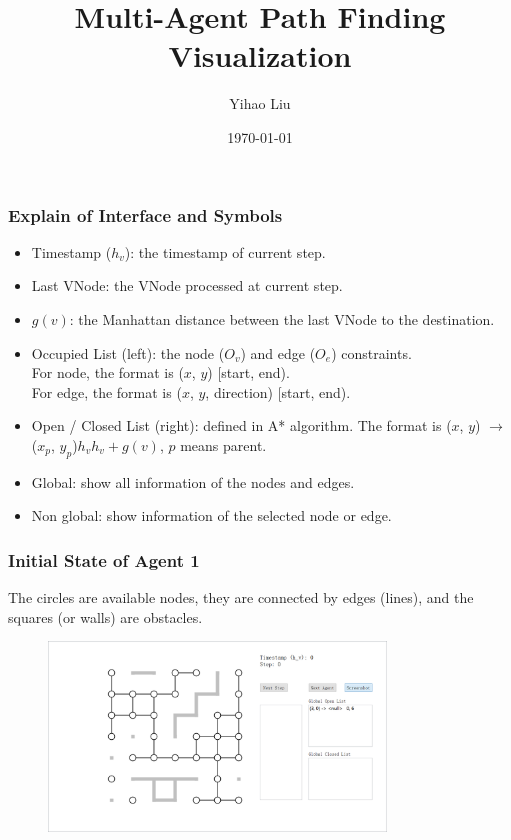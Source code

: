 \documentclass{beamer}
\date{\today}
\title{Multi-Agent Path Finding Visualization}
\author{Yihao Liu}
\begin{document}
\begin{frame}
  \titlepage
\end{frame}

\begin{frame}
\frametitle{Explain of Interface and Symbols}
\begin{itemize}
\item Timestamp ($h_v$): the timestamp of current step.
\item Last VNode: the VNode processed at current step.
\item $g(v)$: the Manhattan distance between the last VNode to the destination.
\item Occupied List (left): the node ($O_v$) and edge ($O_e$) constraints. \\
For node, the format is ($x$, $y$) [start, end). \\
For edge, the format is ($x$, $y$, direction) [start, end).
\item Open / Closed List (right): defined in A* algorithm. The format is ($x$, $y$) $\rightarrow$ ($x_p$, $y_p$)\quad $h_v$\quad $h_v+g(v)$, $p$ means parent.
\item Global: show all information of the nodes and edges.
\item Non global: show information of the selected node or edge.
\end{itemize}


\end{frame}

\begin{frame}
\frametitle{Initial State of Agent 1}
The circles are available nodes, they are connected by edges (lines), and the squares (or walls) are obstacles.
\begin{figure}
\centering
\includegraphics[width=0.8\textwidth]{a1s0.png}
\end{figure}
\end{frame}
\end{document}

